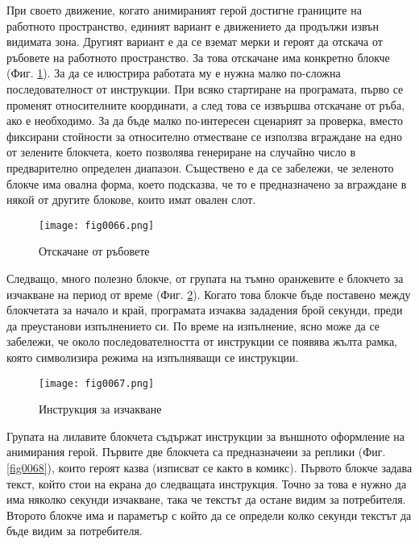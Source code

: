При своето движение, когато анимираният герой достигне границите на работното пространство, единият вариант е движението да продължи извън видимата зона. Другият вариант е да се вземат мерки и героят да отскача от ръбовете на работното пространство. За това отскачане има конкретно блокче (Фиг. \ref{fig0066}). За да се илюстрира работата му е нужна малко по-сложна последователност от инструкции. При всяко стартиране на програмата, първо се променят относителните координати, а след това се извършва отскачане от ръба, ако е необходимо. За да бъде малко по-интересен сценарият за проверка, вместо фиксирани стойности за относително отместване се използва вграждане на едно от зелените блокчета, което позволява генериране на случайно число в предварително определен диапазон. Съществено е да се забележи, че зеленото блокче има овална форма, което подсказва, че то е предназначено за вграждане в някой от другите блокове, които имат овален слот. 

\begin{figure}[H]
  \centering
  \texttt{[image: fig0066.png]}
  \caption{Отскачане от ръбовете}
\label{fig0066}
\end{figure}

Следващо, много полезно блокче, от групата на тъмно оранжевите е блокчето за изчакване на период от време (Фиг. \ref{fig0067}). Когато това блокче бъде поставено между блокчетата за начало и край, програмата изчаква зададения брой секунди, преди да преустанови изпълнението си. По време на изпълнение, ясно може да се забележи, че около последователността от инструкции се появява жълта рамка, която символизира режима на изпълняващи се инструкции. 

\begin{figure}[H]
  \centering
  \texttt{[image: fig0067.png]}
  \caption{Инструкция за изчакване}
\label{fig0067}
\end{figure}

Групата на лилавите блокчета съдържат инструкции за външното оформление на анимирания герой. Първите две блокчета са предназначени за реплики (Фиг. \ref{fig0068}), които героят казва (изписват се както в комикс). Първото блокче задава текст, който стои на екрана до следващата инструкция. Точно за това е нужно да има няколко секунди изчакване, така че текстът да остане видим за потребителя. Второто блокче има и параметър с който да се определи колко секунди текстът да бъде видим за потребителя. 

